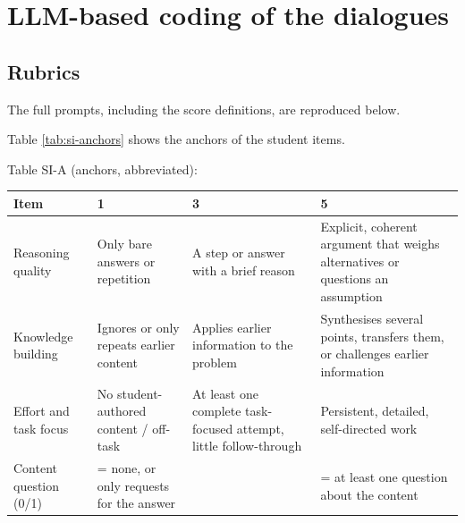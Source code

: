 \documentclass[
  12pt,
]{article}
\begin{document}
\section{LLM-based coding of the dialogues}\label{sec:si-llm-protocol}

\subsection{Rubrics}\label{rubrics}

The full prompts, including the score definitions, are reproduced below.

Table \ref{tab:si-anchors} shows the anchors of the student items.

Table SI-A (anchors, abbreviated):

\begin{longtable}[]{@{}
  >{\raggedright\arraybackslash}p{}
  >{\raggedright\arraybackslash}p{}
  >{\raggedright\arraybackslash}p{}
  >{\raggedright\arraybackslash}p{}@{}}
\toprule\noalign{}
\begin{minipage}[b]{\linewidth}\raggedright
Item
\end{minipage} & \begin{minipage}[b]{\linewidth}\raggedright
1
\end{minipage} & \begin{minipage}[b]{\linewidth}\raggedright
3
\end{minipage} & \begin{minipage}[b]{\linewidth}\raggedright
5
\end{minipage} \\
\midrule\noalign{}
\endhead
\bottomrule\noalign{}
\endlastfoot
Reasoning quality & Only bare answers or repetition & A step or answer with a brief reason & Explicit, coherent argument that weighs alternatives or questions an assumption \\
Knowledge building & Ignores or only repeats earlier content & Applies earlier information to the problem & Synthesises several points, transfers them, or challenges earlier information \\
Effort and task focus & No student-authored content / off-task & At least one complete task-focused attempt, little follow-through & Persistent, detailed, self-directed work \\
Content question (0/1) & 0 = none, or only requests for the answer & & 1 = at least one question about the content \\
\end{longtable}
\end{document}
